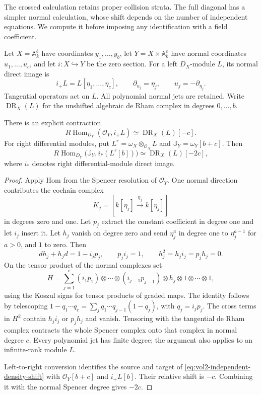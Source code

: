 The crossed calculation retains proper collision strata. The
full diagonal has a simpler normal calculation, whose shift
depends on the number of independent equations. We compute it
before imposing any identification with a field coefficient.

Let $X=\mathbb A^b_k$ have coordinates $y_1,\ldots,y_b$, let
$Y=X\times\mathbb A^c_k$ have normal coordinates
$u_1,\ldots,u_c$, and let $i:X\hookrightarrow Y$ be the zero
section. For a left $D_X$-module $L$, its normal direct image is
\[
 i_+L=L[\eta_1,\ldots,\eta_c],\qquad
 \partial_{u_j}=\eta_j,\qquad u_j=-\partial_{\eta_j}.
\]
Tangential operators act on $L$. All polynomial normal jets are
retained. Write $\operatorname{DR}_X(L)$ for the unshifted
algebraic de Rham complex in degrees $0,\ldots,b$.

\begin{proposition}\label{prop:vol2-independent-normal-support}
There is an explicit contraction
\[
 R\operatorname{Hom}_{D_Y}(\mathcal O_Y,i_+L)
       \simeq\operatorname{DR}_X(L)[-c].
\]
For right differential modules, put
$L^r=\omega_X\otimes_{\mathcal O_X}L$ and
$\mathbb J_Y=\omega_Y[b+c]$. Then
\begin{equation}\label{eq:vol2-independent-density-shift}
 R\operatorname{Hom}_{D_Y}
       \bigl(\mathbb J_Y,i_*(L^r[b])\bigr)
       \simeq\operatorname{DR}_X(L)[-2c],
\end{equation}
where $i_*$ denotes right differential-module direct image.
\end{proposition}

\begin{proof}
Apply Hom from the Spencer resolution of $\mathcal O_Y$.
One normal direction contributes the cochain complex
\[
 K_j=[k[\eta_j]\xrightarrow{\eta_j}k[\eta_j]]
\]
in degrees zero and one. Let $p_j$ extract the constant
coefficient in degree one and let $i_j$ insert it. Let $h_j$
vanish on degree zero and send $\eta_j^a$ in degree one to
$\eta_j^{a-1}$ for $a>0$, and $1$ to zero. Then
\[
 dh_j+h_jd=1-i_jp_j,\qquad p_ji_j=1,
 \qquad h_j^2=h_ji_j=p_jh_j=0.
\]
On the tensor product of the normal complexes set
\[
 H=\sum_{j=1}^c(i_1p_1)\otimes\cdots\otimes(i_{j-1}p_{j-1})
                         \otimes h_j\otimes1\otimes\cdots\otimes1,
\]
using the Koszul signs for tensor products of graded maps.
The identity follows by telescoping
$1-q_1\cdots q_c=\sum_jq_1\cdots q_{j-1}(1-q_j)$, with
$q_j=i_jp_j$. The cross terms in $H^2$ contain $h_ji_j$ or
$p_jh_j$ and vanish. Tensoring with the tangential de Rham
complex contracts the whole Spencer complex onto that complex
in normal degree $c$. Every polynomial jet has finite degree;
the argument also applies to an infinite-rank module $L$.

Left-to-right conversion identifies the source and target of
\eqref{eq:vol2-independent-density-shift} with
$\mathcal O_Y[b+c]$ and $i_+L[b]$. Their relative shift is
$-c$. Combining it with the normal Spencer degree gives
$-2c$.
\end{proof}

